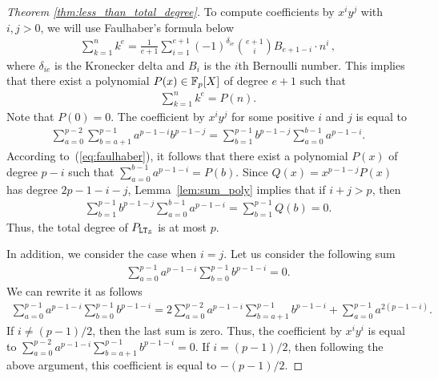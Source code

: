 \begin{proof}[Theorem \ref{thm:less_than_total_degree}]
    To compute coefficients by $x^i y^j$ with $i, j > 0$, we will use Faulhaber's formula below
    \begin{align*}
      \sum_{k=1}^n k^e = \frac{1}{e+1} \sum_{i=1}^{e+1} (-1)^{\delta_{ie}} \binom{e+1}{i} B_{e+1-i} \cdot n^i\,,
    \end{align*}
    where $\delta_{ie}$ is the Kronecker delta and $B_{i}$ is the $i$th Bernoulli number.
    This implies that there exist a polynomial $P(x) \in \mathbb{F}_p[X]$ of degree $e+1$ such that
    \begin{align}\label{eq:faulhaber}
      \sum_{k=1}^n k^e = P(n).
    \end{align}
    Note that $P(0) = 0$.
    The coefficient by $x^i y^j$ for some positive $i$ and $j$ is equal to
    \begin{align*}
      \sum_{a = 0}^{p-2} \sum_{b=a+1}^{p-1} a^{p-1-i} b^{p-1-j} = \sum_{b = 1}^{p-1} b^{p-1-j} \sum_{a=0}^{b-1} a^{p-1-i}.
    \end{align*}
    According to~(\ref{eq:faulhaber}), it follows that there exist a polynomial $P(x)$ of degree $p-i$ such that $\sum_{a=0}^{b-1} a^{p-1-i} = P(b)$.
    Since $Q(x) = x^{p-1-j} P(x)$ has degree $2p-1-i-j$, Lemma~\ref{lem:sum_poly} implies that if $i+j > p$, then
    \begin{align*}
      \sum_{b = 1}^{p-1} b^{p-1-j} \sum_{a=0}^{b-1} a^{p-1-i} = \sum_{b=1}^{p-1} Q(b) = 0.
    \end{align*}
    Thus, the total degree of $P_{\mathtt{LT}_{\mathcal{S}}}$ is at most $p$.

    In addition, we consider the case when $i = j$.
    Let us consider the following sum
    \begin{align*}
      \sum_{a=0}^{p-1} a^{p-1-i} \sum_{b=0}^{p-1} b^{p-1-i} = 0.
    \end{align*}
    We can rewrite it as follows
    \begin{align*}
      \sum_{a=0}^{p-1} a^{p-1-i} \sum_{b=0}^{p-1} b^{p-1-i} = 2\sum_{a=0}^{p-2} a^{p-1-i} \sum_{b=a+1}^{p-1} b^{p-1-i} + \sum_{a=0}^{p-1} a^{2(p-1-i)}.
    \end{align*}
    If $i \ne (p-1)/2$, then the last sum is zero.
    Thus, the coefficient by $x^i y^i$ is equal to $\sum_{a=0}^{p-2} a^{p-1-i} \sum_{b=a+1}^{p-1} b^{p-1-i} = 0$.
    If $i = (p-1)/2$, then following the above argument, this coefficient is equal to $-(p-1)/2$.
  \end{proof}


